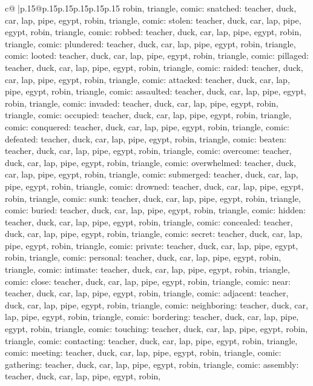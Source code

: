 \documentclass{article}
\begin{document}
{\begin{supertabular}{c@{$\;$}|p{.15\linewidth}@{}p{.15\linewidth}p{.15\linewidth}p{.15\linewidth}p{.15\linewidth}p{.15\linewidth}}
{{{robin, triangle, comic\n\nCLUE: snatched\nTARGETS: teacher, duck, car, lap, pipe, egypt, robin, triangle, comic\n\nCLUE: stolen\nTARGETS: teacher, duck, car, lap, pipe, egypt, robin, triangle, comic\n\nCLUE: robbed\nTARGETS: teacher, duck, car, lap, pipe, egypt, robin, triangle, comic\n\nCLUE: plundered\nTARGETS: teacher, duck, car, lap, pipe, egypt, robin, triangle, comic\n\nCLUE: looted\nTARGETS: teacher, duck, car, lap, pipe, egypt, robin, triangle, comic\n\nCLUE: pillaged\nTARGETS: teacher, duck, car, lap, pipe, egypt, robin, triangle, comic\n\nCLUE: raided\nTARGETS: teacher, duck, car, lap, pipe, egypt, robin, triangle, comic\n\nCLUE: attacked\nTARGETS: teacher, duck, car, lap, pipe, egypt, robin, triangle, comic\n\nCLUE: assaulted\nTARGETS: teacher, duck, car, lap, pipe, egypt, robin, triangle, comic\n\nCLUE: invaded\nTARGETS: teacher, duck, car, lap, pipe, egypt, robin, triangle, comic\n\nCLUE: occupied\nTARGETS: teacher, duck, car, lap, pipe, egypt, robin, triangle, comic\n\nCLUE: conquered\nTARGETS: teacher, duck, car, lap, pipe, egypt, robin, triangle, comic\n\nCLUE: defeated\nTARGETS: teacher, duck, car, lap, pipe, egypt, robin, triangle, comic\n\nCLUE: beaten\nTARGETS: teacher, duck, car, lap, pipe, egypt, robin, triangle, comic\n\nCLUE: overcome\nTARGETS: teacher, duck, car, lap, pipe, egypt, robin, triangle, comic\n\nCLUE: overwhelmed\nTARGETS: teacher, duck, car, lap, pipe, egypt, robin, triangle, comic\n\nCLUE: submerged\nTARGETS: teacher, duck, car, lap, pipe, egypt, robin, triangle, comic\n\nCLUE: drowned\nTARGETS: teacher, duck, car, lap, pipe, egypt, robin, triangle, comic\n\nCLUE: sunk\nTARGETS: teacher, duck, car, lap, pipe, egypt, robin, triangle, comic\n\nCLUE: buried\nTARGETS: teacher, duck, car, lap, pipe, egypt, robin, triangle, comic\n\nCLUE: hidden\nTARGETS: teacher, duck, car, lap, pipe, egypt, robin, triangle, comic\n\nCLUE: concealed\nTARGETS: teacher, duck, car, lap, pipe, egypt, robin, triangle, comic\n\nCLUE: secret\nTARGETS: teacher, duck, car, lap, pipe, egypt, robin, triangle, comic\n\nCLUE: private\nTARGETS: teacher, duck, car, lap, pipe, egypt, robin, triangle, comic\n\nCLUE: personal\nTARGETS: teacher, duck, car, lap, pipe, egypt, robin, triangle, comic\n\nCLUE: intimate\nTARGETS: teacher, duck, car, lap, pipe, egypt, robin, triangle, comic\n\nCLUE: close\nTARGETS: teacher, duck, car, lap, pipe, egypt, robin, triangle, comic\n\nCLUE: near\nTARGETS: teacher, duck, car, lap, pipe, egypt, robin, triangle, comic\n\nCLUE: adjacent\nTARGETS: teacher, duck, car, lap, pipe, egypt, robin, triangle, comic\n\nCLUE: neighboring\nTARGETS: teacher, duck, car, lap, pipe, egypt, robin, triangle, comic\n\nCLUE: bordering\nTARGETS: teacher, duck, car, lap, pipe, egypt, robin, triangle, comic\n\nCLUE: touching\nTARGETS: teacher, duck, car, lap, pipe, egypt, robin, triangle, comic\n\nCLUE: contacting\nTARGETS: teacher, duck, car, lap, pipe, egypt, robin, triangle, comic\n\nCLUE: meeting\nTARGETS: teacher, duck, car, lap, pipe, egypt, robin, triangle, comic\n\nCLUE: gathering\nTARGETS: teacher, duck, car, lap, pipe, egypt, robin, triangle, comic\n\nCLUE: assembly\nTARGETS: teacher, duck, car, lap, pipe, egypt, robin, }}}
\end{supertabular}}
\end{document}
